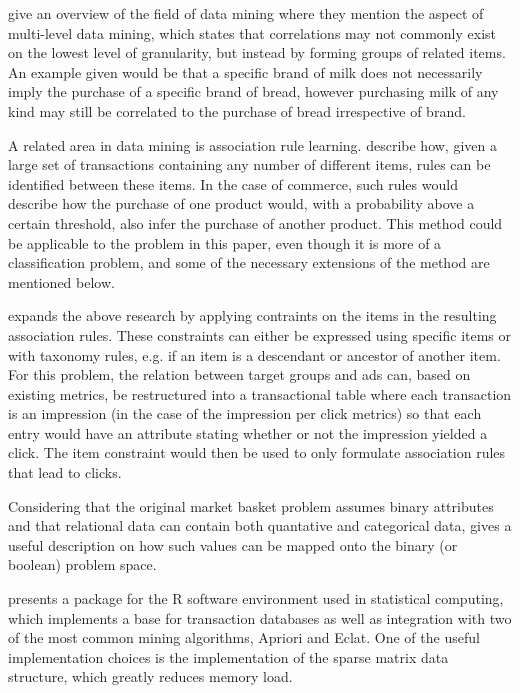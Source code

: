 \documentclass[10pt,twocolumn]{article}
\begin{document}
\citet{Chen1996} give an overview of the field of data mining where they mention the aspect of multi-level data mining, which states that correlations may not commonly exist on the lowest level of granularity, but instead by forming groups of related items. An example given would be that a specific brand of milk does not necessarily imply the purchase of a specific brand of bread, however purchasing milk of any kind may still be correlated to the purchase of bread irrespective of brand.

A related area in data mining is association rule learning. \citet{Agrawal1993} describe how, given a large set of transactions containing any number of different items, rules can be identified between these items. In the case of commerce, such rules would describe how the purchase of one product would, with a probability above a certain threshold, also infer the purchase of another product. This method could be applicable to the problem in this paper, even though it is more of a classification problem, and some of the necessary extensions of the method are mentioned below.

\citet{Srikant1997} expands the above research by applying contraints on the items in the resulting association rules. These constraints can either be expressed using specific items or with taxonomy rules, e.g. if an item is a descendant or ancestor of another item. For this problem, the relation between target groups and ads can, based on existing metrics, be restructured into a transactional table where each transaction is an impression (in the case of the impression per click metrics) so that each entry would have an attribute stating whether or not the impression yielded a click. The item constraint would then be used to only formulate association rules that lead to clicks.

Considering that the original market basket problem assumes binary attributes and that relational data can contain both quantative and categorical data, \citep{Srikant1996} gives a useful description on how such values can be mapped onto the binary (or boolean) problem space.

\citet{Hahsler2007} presents a package for the R software environment used in statistical computing, which implements a base for transaction databases as well as integration with two of the most common mining algorithms, Apriori and Eclat. One of the useful implementation choices is the implementation of the sparse matrix data structure, which greatly reduces memory load.
\end{document}
